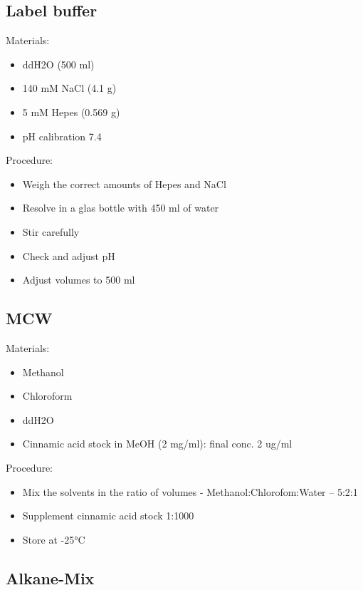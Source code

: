 \documentclass[]{book}
\providecommand{\tightlist}{%
  \setlength{\itemsep}{0pt}\setlength{\parskip}{0pt}}
\begin{document}
\hypertarget{washingbuffer}{%
\subsection{Label buffer}\label{washingbuffer}}

Materials:

\begin{itemize}
\tightlist
\item
  ddH2O (500 ml)
\item
  140 mM NaCl (4.1 g)
\item
  5 mM Hepes (0.569 g)
\item
  pH calibration 7.4
\end{itemize}

Procedure:

\begin{itemize}
\tightlist
\item
  Weigh the correct amounts of Hepes and NaCl
\item
  Resolve in a glas bottle with 450 ml of water
\item
  Stir carefully
\item
  Check and adjust pH
\item
  Adjust volumes to 500 ml
\end{itemize}

\hypertarget{mcw}{%
\subsection{MCW}\label{mcw}}

Materials:

\begin{itemize}
\tightlist
\item
  Methanol
\item
  Chloroform
\item
  ddH2O
\item
  Cinnamic acid stock in MeOH (2 mg/ml): final conc. 2 ug/ml
\end{itemize}

Procedure:

\begin{itemize}
\tightlist
\item
  Mix the solvents in the ratio of volumes - Methanol:Chlorofom:Water -- 5:2:1
\item
  Supplement cinnamic acid stock 1:1000
\item
  Store at -25°C
\end{itemize}

\hypertarget{alkanemix}{%
\subsection{Alkane-Mix}\label{alkanemix}}
\end{document}
